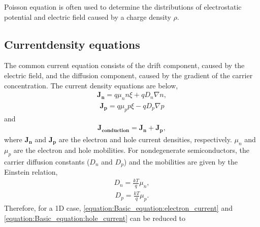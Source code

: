 \documentclass[letterpaper,10pt,english]{sphinxmanual}
\numberwithin{equation}{section}
\begin{document}
\sphinxAtStartPar
Poisson equation is often used to determine the distributions of electrostatic potential and electric field caused by a charge density \(\rho\).


\subsection{Current\sphinxhyphen{}density equations}
\label{\detokenize{Basic_equation:current-density-equations}}
\sphinxAtStartPar
The common current equation consists of the drift component, caused by the electric field, and the diffusion component, caused by the gradient of the carrier concentration.
The current density equations are below,
\begin{equation}\label{equation:Basic_equation:electron_current}
\begin{split}\mathbf{J_n} = q\mu_nn\xi + qD_n\nabla n,\end{split}
\end{equation}\begin{equation}\label{equation:Basic_equation:hole_current}
\begin{split}\mathbf{J_p} = q\mu_pp\xi - qD_p\nabla p\end{split}
\end{equation}
\sphinxAtStartPar
and
\begin{equation}\label{equation:Basic_equation:total_current}
\begin{split}\mathbf{J_{conduction}} = \mathbf{J_n} + \mathbf{J_p},\end{split}
\end{equation}
\sphinxAtStartPar
where \(\mathbf{J_n}\) and \(\mathbf{J_p}\) are the electron and hole current densities, respectively.
\(\mu_n\) and \(\mu_ p\) are the electron and hole mobilities.
For nondegenerate semiconductors, the carrier diffusion constants (\(D_n\) and \(D_p\)) and the mobilities are given by the Einstein relation,
\begin{equation}\label{equation:Basic_equation:electron_diffusion}
\begin{split}D_n = \frac{kT}{q}\mu_n,\end{split}
\end{equation}\begin{equation}\label{equation:Basic_equation:hole_diffusion}
\begin{split}D_p = \frac{kT}{q}\mu_p.\end{split}
\end{equation}
\sphinxAtStartPar
Therefore, for a 1D case, \eqref{equation:Basic_equation:electron_current} and \eqref{equation:Basic_equation:hole_current} can be reduced to
\end{document}
